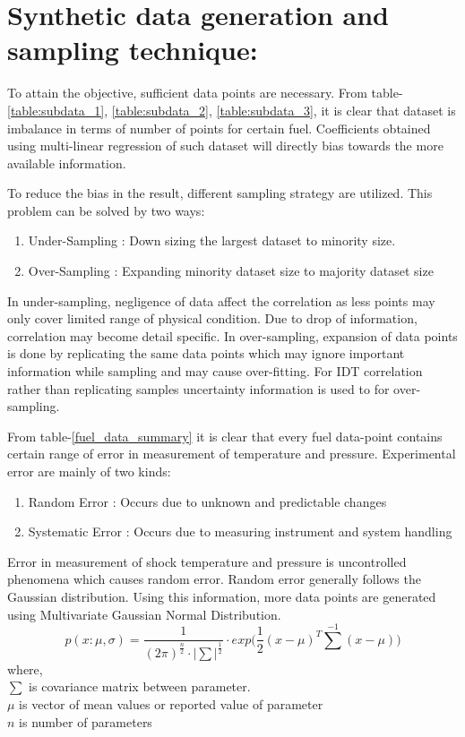 \documentclass[preprint,12pt]{elsarticle}
\begin{document}
		
					
					\section{Synthetic data generation and sampling technique:}
						To attain the objective, sufficient data points are necessary. From table- \ref{table:subdata_1}, \ref{table:subdata_2}, \ref{table:subdata_3}, it is clear that dataset is imbalance in terms of  number of points for certain fuel. Coefficients obtained using multi-linear regression of such dataset will directly bias towards the more available information. 
						
						To reduce the bias in the result, different sampling strategy are utilized. This problem can be solved by two ways: \cite{chawla2009data}
						\begin{enumerate}
							\item Under-Sampling : Down sizing the largest dataset to minority size.
							\item Over-Sampling : Expanding minority dataset size to majority dataset size 					
						\end{enumerate}
						
					In under-sampling, negligence of data affect the correlation as less points may only cover limited range of physical condition. Due to drop of information, correlation may become detail specific. In over-sampling, expansion of data points is done by replicating the same data points which may ignore important information while sampling and may cause over-fitting. For IDT correlation rather than  replicating samples uncertainty information is used to for over-sampling.
					
					From table-\ref{fuel_data_summary} it is clear that every fuel data-point contains certain range of error in measurement of temperature and pressure. Experimental error are mainly of two kinds:
					\begin{enumerate}
						\item Random Error : Occurs due to unknown and predictable changes  
						\item Systematic Error : Occurs due to measuring instrument and system handling
					\end{enumerate}
					Error in measurement of shock temperature and pressure is uncontrolled phenomena which causes random error. Random error generally follows the Gaussian distribution. Using this information, more data points are generated using Multivariate Gaussian Normal Distribution.
					\begin{equation}
							p(x:\mu,\sigma) = \frac{1}{(2\pi)^{\frac{n}{2}} \cdot |\sum|^{\frac{1}{2}}} \cdot exp\bigg(\frac{1}{2}(x-\mu)^T {\sum}^{-1}(x-\mu)\bigg)
					\end{equation}
					where,\\ 
					$\sum$ is covariance matrix between parameter.\\ 
					$\mu$ is vector of mean values or reported value of parameter \\
					$n$ is number of parameters 
\end{document}
